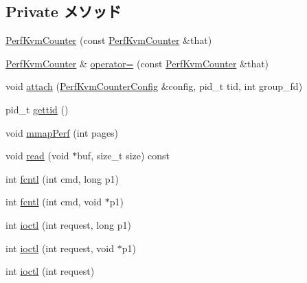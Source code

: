 \subsection*{Private メソッド}
\begin{DoxyCompactItemize}
\item 
\hyperlink{classPerfKvmCounter_a68c89e9e7ce1cbe5b5b7111307f16b61}{PerfKvmCounter} (const \hyperlink{classPerfKvmCounter}{PerfKvmCounter} \&that)
\item 
\hyperlink{classPerfKvmCounter}{PerfKvmCounter} \& \hyperlink{classPerfKvmCounter_a11a80ba1c558b286f8459d8bbe60fe3f}{operator=} (const \hyperlink{classPerfKvmCounter}{PerfKvmCounter} \&that)
\item 
void \hyperlink{classPerfKvmCounter_a82b3eaa20dc8f83c4ea69352954c2e7d}{attach} (\hyperlink{classPerfKvmCounterConfig}{PerfKvmCounterConfig} \&config, pid\_\-t tid, int group\_\-fd)
\item 
pid\_\-t \hyperlink{classPerfKvmCounter_af0449193b7cded86e600f052d0aabd39}{gettid} ()
\item 
void \hyperlink{classPerfKvmCounter_a32358ddbb202e0319d138e8cb3749ed9}{mmapPerf} (int pages)
\item 
void \hyperlink{classPerfKvmCounter_a382308644478e0220390350cc53c1a4a}{read} (void $\ast$buf, size\_\-t size) const 
\end{DoxyCompactItemize}
\begin{Indent}{\bf }\par
{\em \label{_amgrpd41d8cd98f00b204e9800998ecf8427e}
 }\begin{DoxyCompactItemize}
\item 
int \hyperlink{classPerfKvmCounter_a59e734a4d9a204be38f0af7d82091648}{fcntl} (int cmd, long p1)
\item 
int \hyperlink{classPerfKvmCounter_a801e1d8b832b7d2ea829411655d3d001}{fcntl} (int cmd, void $\ast$p1)
\item 
int \hyperlink{classPerfKvmCounter_a5b8772915b1f8991ad9f3f9afcd681b8}{ioctl} (int request, long p1)
\item 
int \hyperlink{classPerfKvmCounter_aa59d1d5b429119949c0a1e386cb760e4}{ioctl} (int request, void $\ast$p1)
\item 
int \hyperlink{classPerfKvmCounter_af07e229bfb88ad702cdbc617b3b46578}{ioctl} (int request)
\end{DoxyCompactItemize}
\end{Indent}
